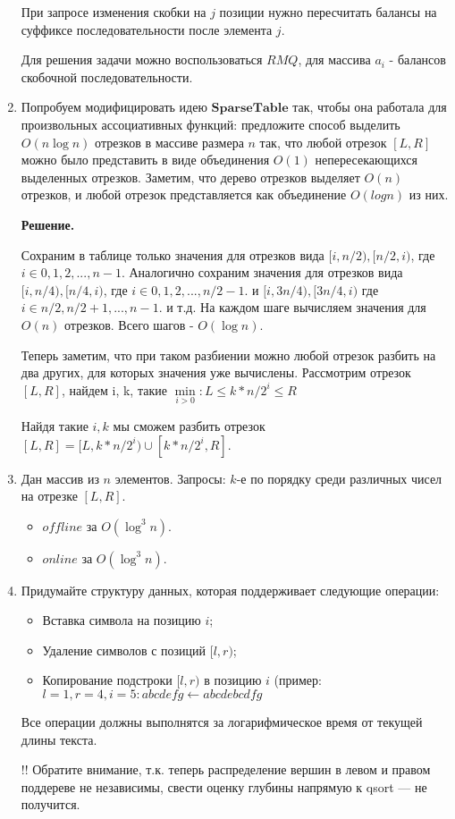 \begin{enumerate}
	При запросе изменения скобки на $j$ позиции нужно пересчитать балансы на суффиксе 
	последовательности после элемента $j$.
	
	Для решения задачи можно воспользоваться $RMQ$, для массива $a_i$ - балансов скобочной 
	последовательности.
	
	\item Попробуем модифицировать идею $\mathbf{SparseTable}$ так, чтобы она работала для 
	произвольных ассоциативных функций: предложите способ выделить $O(n \log n)$ отрезков в 
	массиве размера $n$ так, что любой отрезок $[L, R]$ можно было представить в виде 
	объединения $O(1)$ непересекающихся выделенных отрезков. Заметим, что дерево отрезков 
	выделяет $O(n)$ отрезков, и любой отрезок представляется как объединение $O(log n)$ из них.
	
	\textbf{Решение.}
	
	Сохраним в таблице только значения для отрезков вида $[i, n/2), [n/2, i)$, где $i\in 0, 1, 
	2,..., n - 1$. Аналогично сохраним значения для отрезков вида $[i, n/4), [n/4, i)$, где 
	$i\in 0, 1, 2,..., n/2 - 1$. и $[i, 3n/4), [3n/4, i)$ где $i\in n/2, n/2 + 1,..., n - 1$.
	и т.д. На каждом шаге вычисляем значения для $O(n)$ отрезков. Всего шагов - $O(\log n)$.
	
	Теперь заметим, что при таком разбиении можно любой отрезок разбить на два других, для 
	которых значения уже вычислены. Рассмотрим отрезок $[L, R]$, найдем i, k, такие 
	$\min\limits_{i > 0} : L\leqslant k*n/2^i \leqslant R$
	
	Найдя такие $i, k$ мы сможем разбить отрезок $[L,R] = [L, k*n/2^i) \cup [k*n/2^i, R]$. 
	
	\item Дан массив из $n$ элементов. Запросы: $k$-е по порядку среди различных чисел на отрезке $[L, R]$.
	\begin{itemize}
		\item $offline$ за $O(\log^3 n)$.
		\item $online$ за $O(\log^3 n)$.
	\end{itemize}
	
	\item Придумайте структуру данных, которая поддерживает следующие операции:
	
	\begin{itemize}
		\item Вставка символа на позицию $i$;
		\item Удаление символов с позиций $[l, r)$;
		\item Копирование подстроки $[l, r)$ в позицию $i$ (пример: $l = 1, r = 4, i = 5 : abcdefg \leftarrow abcdebcdfg$
	\end{itemize}
	
	Все операции должны выполнятся за логарифмическое время от текущей длины текста.
		
	!! Обратите внимание, т.к. теперь распределение вершин в левом и правом поддереве не 
	независимы, свести оценку глубины напрямую к qsort — не получится.
		
\end{enumerate}


